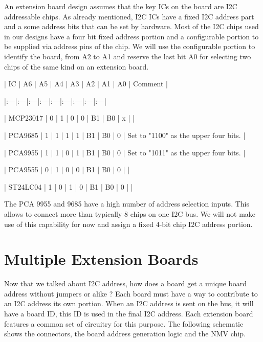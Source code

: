 An extension board design assumes that the key ICs on the board are I2C addressable chips. As already mentioned, I2C ICs have a fixed I2C address part and a some address bits that can be set by hardware. Most of the I2C chips used in our designs have a four bit fixed address portion and a configurable portion to be supplied via address pins of the chip. We will use the configurable portion to identify the board, from A2 to A1 and reserve the last bit A0 for selecting two chips of the same kind on an extension board.

| IC | A6 | A5 | A4 | A3 | A2 | A1 | A0 | Comment |

|:---|:---|:---|:---|:---|:---|:---|:---|:---|

| MCP23017 | 0 | 1 | 0 | 0 | B1 | B0 | x | |

| PCA9685  | 1 | 1 | 1 | 1 | B1 | B0 | 0 | Set to "1100" as the upper four bits. |

| PCA9955  | 1 | 1 | 0 | 1 | B1 | B0 | 0 | Set to "1011" as the upper four bits. |

| PCA9555  | 0 | 1 | 0 | 0 | B1 | B0 | 0 | |

| ST24LC04 | 1 | 0 | 1 | 0 | B1 | B0 | 0 | |

The PCA 9955 and 9685 have a high number of address selection inputs. This allows to connect more than typically 8 chips on one I2C bus. We will not make use of this capability for now and assign a fixed 4-bit chip I2C address portion.

\section{Multiple Extension Boards}

Now that we talked about I2C address, how does a board get a unique board address without jumpers or alike ? Each board must have a way to contribute to an I2C address its own portion. When an I2C address is sent on the bus, it will have a board ID, this ID is used in the final I2C address. Each extension board features a common set of circuitry for this purpose. The following schematic shows the connectors, the board address generation logic and the NMV chip.



